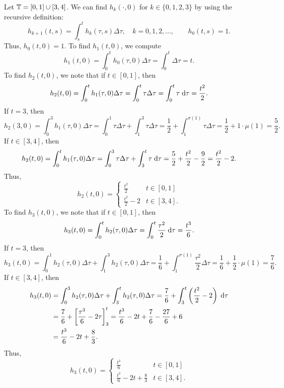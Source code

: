 \documentclass[nonumber]{homework}
\begin{document}
	Let $\mathbb{T} = [0,1] \cup [3,4]$. We can find $h_k(\cdot,0)$ for $k \in \{0,1,2,3\}$ by using the recursive definition:
	\begin{equation*}
		h_{k+1}(t,s) = \int_s^t h_k(\tau, s)\Delta \tau, \quad k = 0,1,2,\dots, \qquad h_0(t,s) = 1.
	\end{equation*}
	Thus, $h_0(t,0) = 1$. To find $h_1(t,0)$, we compute
	\begin{equation*}
		h_1(t,0) = \int_0^t h_0(\tau,0)\Delta \tau = \int_0^t\Delta\tau = t.
	\end{equation*}
	To find $h_2(t,0)$, we note that if $t \in [0,1]$, then
	\begin{equation*}
		h_2(t,0) = \int_0^t h_1(\tau,0)\Delta\tau = \int_0^t\tau\Delta\tau = \int_0^t \tau\;\text{d}\tau = \frac{t^2}{2}.
	\end{equation*}
	If $t = 3$, then
	\begin{equation*}
		h_2(3,0) = \int_0^3h_1(\tau,0)\Delta\tau = \int_0^1\tau\Delta\tau + \int_1^3\tau\Delta\tau = \frac{1}{2} + \int_1^{\sigma(1)}\tau\Delta\tau = \frac{1}{2} + 1 \cdot\mu(1) = \frac{5}{2}.
	\end{equation*}
	If $t \in [3,4]$, then
	\begin{equation*}
		h_2(t,0) = \int_0^th_1(\tau,0)\Delta\tau = \int_0^3\tau\Delta \tau + \int_3^t \tau\;\text{d}\tau = \frac{5}{2} + \frac{t^2}{2} - \frac{9}{2} = \frac{t^2}{2} - 2.
	\end{equation*}
	Thus, 
	\begin{equation*}
		h_2(t,0) = \begin{cases}
			\frac{t^2}{2} & t \in [0,1] \\[0.5em]
			\frac{t^2}{2} - 2 & t \in [3,4].
		\end{cases}
	\end{equation*}
	To find $h_3(t,0)$, we note that if $t \in [0,1]$, then
	\begin{equation*}
		h_3(t,0) = \int_0^t h_2(\tau,0)\Delta\tau = \int_0^t \frac{\tau^2}{2}\;\text{d}\tau = \frac{t^3}{6}.
	\end{equation*}
	If $t = 3$, then
	\begin{equation*}
		h_3(t,0) = \int_0^1 h_2(\tau,0)\Delta\tau + \int_1^3h_2(\tau,0)\Delta\tau = \frac{1}{6} + \int_1^{\sigma(1)} \frac{\tau^2}{2}\Delta\tau = \frac{1}{6} + \frac{1}{2}\cdot\mu(1) = \frac{7}{6}.
	\end{equation*}
	If $t \in [3,4]$, then
	\begin{align*}
		h_3(t,0) &= \int_0^3 h_2(\tau,0)\Delta\tau + \int_3^th_2(\tau,0)\Delta\tau = \frac{7}{6} + \int_3^t \left(\frac{t^2}{2} - 2\right)\;\text{d} \tau \\
		&= \frac{7}{6} + \left[\frac{\tau^3}{6} - 2\tau\right]_3^t = \frac{t^3}{6} - 2t + \frac{7}{6} - \frac{27}{6} + 6 \\
		&= \frac{t^3}{6} - 2t +\frac{8}{3}. 
	\end{align*}
	Thus,
	\begin{equation*}
		h_3(t,0) = \begin{cases}
			\frac{t^3}{6} & t\in[0,1] \\[0.5em]
			\frac{t^3}{6} - 2t + \frac{8}{3} & t\in [3,4].	
		\end{cases}
	\end{equation*}
\end{document}
